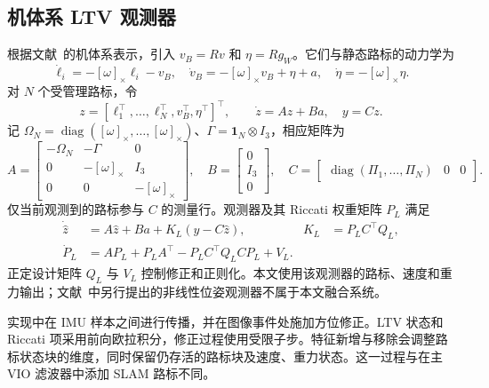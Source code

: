 \documentclass[a4paper,runningheads]{llncs}
\newcommand{\sk}[1]{[#1]_{\times}}
\newcommand{\diag}{\operatorname{diag}}
\begin{document}
\subsection{机体系 LTV 观测器}
根据文献~\cite{wang2024}的机体系表示，引入 $v_B=Rv$ 和 $\eta=Rg_W$。它们与静态路标的动力学为
\begin{equation}
 \dot\ell_i=-\sk{\omega}\ell_i-v_B,\quad
 \dot v_B=-\sk{\omega}v_B+\eta+a,\quad
 \dot\eta=-\sk{\omega}\eta .
 \label{eq:ltvdynamics}
\end{equation}
对 $N$ 个受管理路标，令
\begin{equation}
 z=[\ell_1^\top,\ldots,\ell_N^\top,v_B^\top,\eta^\top]^\top,\qquad
 \dot z=Az+Ba,\quad y=Cz .
 \label{eq:ltvstate}
\end{equation}
记 $\Omega_N=\diag(\sk{\omega},\ldots,\sk{\omega})$、$\Gamma=\bm{1}_N\otimes I_3$，相应矩阵为
\begin{equation}
 A=\begin{bmatrix}
 -\Omega_N&-\Gamma&0\\
 0&-\sk{\omega}&I_3\\
 0&0&-\sk{\omega}
 \end{bmatrix},\quad
 B=\begin{bmatrix}0\\I_3\\0\end{bmatrix},\quad
 C=\begin{bmatrix}\diag(\Pi_1,\ldots,\Pi_N)&0&0\end{bmatrix}.
 \label{eq:ltvmatrices}
\end{equation}
仅当前观测到的路标参与 $C$ 的测量行。观测器及其 Riccati 权重矩阵 $P_L$ 满足
\begin{align}
 \dot{\hat z}&=A\hat z+Ba+K_L(y-C\hat z),&
 K_L&=P_LC^\top Q_L, \label{eq:observer}\\
 \dot P_L&=AP_L+P_LA^\top-P_LC^\top Q_LCP_L+V_L .
 \label{eq:riccati}
\end{align}
正定设计矩阵 $Q_L$ 与 $V_L$ 控制修正和正则化。本文使用该观测器的路标、速度和重力输出；文献~\cite{wang2024}中另行提出的非线性位姿观测器不属于本文融合系统。

实现中在 IMU 样本之间进行传播，并在图像事件处施加方位修正。LTV 状态和 Riccati 项采用前向欧拉积分，修正过程使用受限子步。特征新增与移除会调整路标状态块的维度，同时保留仍存活的路标块及速度、重力状态。这一过程与在主 VIO 滤波器中添加 SLAM 路标不同。
\end{document}
